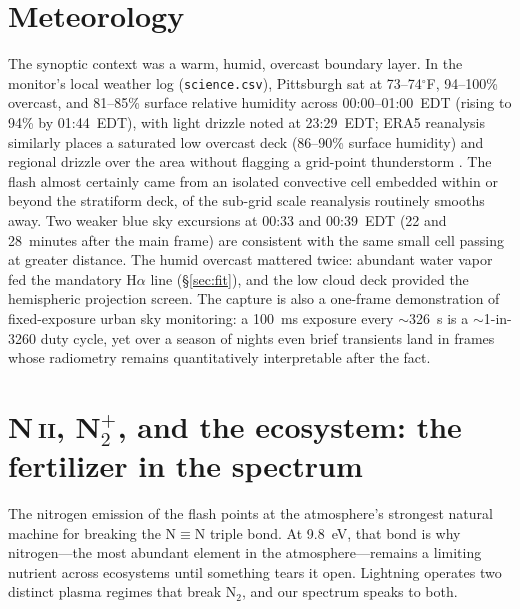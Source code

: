\documentclass[11pt,a4paper]{article}
\newcommand{\code}[1]{\texttt{\small #1}}
\newcommand{\Ntp}{N$_2^+$}
\begin{document}
\section{Meteorology}
The synoptic context was a warm, humid, overcast boundary layer. In the
monitor's local weather log (\code{science.csv}), Pittsburgh sat at
73--74$^\circ$F, 94--100\% overcast, and 81--85\% surface relative humidity
across 00:00--01:00~EDT (rising to 94\% by 01:44~EDT), with light drizzle
noted at 23:29~EDT; ERA5 reanalysis similarly places a saturated low overcast
deck (86--90\% surface humidity) and regional drizzle over the area without
flagging a grid-point thunderstorm \citep{hersbach2020}. The flash almost
certainly came from an isolated convective cell embedded within or beyond the
stratiform deck, of the sub-grid scale reanalysis routinely smooths away. Two
weaker blue sky excursions at 00:33 and 00:39~EDT (22 and 28~minutes after the
main frame) are consistent with the same small cell passing at greater
distance. The humid overcast mattered twice: abundant water vapor fed the
mandatory H$\alpha$ line (\S\ref{sec:fit}), and the low cloud deck provided
the hemispheric projection screen. The capture is also a one-frame
demonstration of fixed-exposure urban sky monitoring: a 100~ms exposure every
$\sim$326~s is a $\sim$1-in-3260 duty cycle, yet over a season of nights even
brief transients land in frames whose radiometry remains quantitatively
interpretable after the fact.

\section{\texorpdfstring{N\,\textsc{ii}, \Ntp{}, and the ecosystem: the fertilizer in the spectrum}{N II, N2+, and the ecosystem: the fertilizer in the spectrum}}
\label{sec:ecosystem}
The nitrogen emission of the flash points at the atmosphere's strongest
natural machine for breaking the N$\equiv$N triple bond. At 9.8~eV, that bond
is why nitrogen---the most abundant element in the atmosphere---remains a
limiting nutrient across ecosystems until something tears it open. Lightning
operates two distinct plasma regimes that break N$_2$, and our spectrum speaks
to both.
\end{document}
